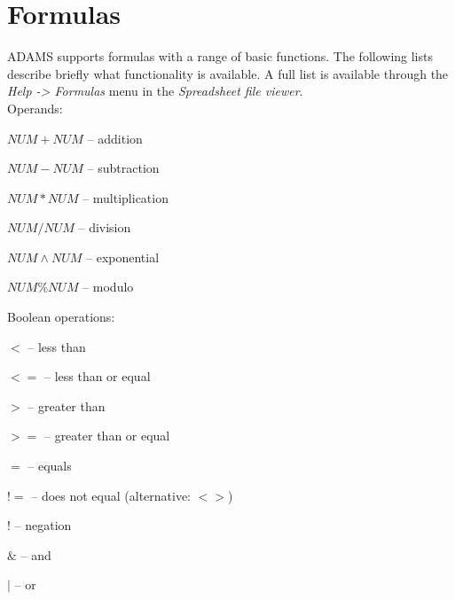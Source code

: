 \documentclass[a4paper]{book}
\begin{document}
\clearpage
\chapter{Formulas}
ADAMS supports formulas with a range of basic functions. The following lists
describe briefly what functionality is available. A full list is available 
through the \textit{Help -> Formulas} menu in the \textit{Spreadsheet file viewer}. \\

\noindent Operands:
\begin{tight_itemize}
	\item \textit{$NUM + NUM$} -- addition
	\item \textit{$NUM - NUM$} -- subtraction
	\item \textit{$NUM * NUM$} -- multiplication
	\item \textit{$NUM / NUM$} -- division
	\item \textit{$NUM \wedge NUM$} -- exponential
	\item \textit{$NUM \% NUM$} -- modulo
\end{tight_itemize}

\noindent Boolean operations:
\begin{tight_itemize}
	\item \textit{$<$} -- less than
	\item \textit{$<=$} -- less than or equal
	\item \textit{$>$} -- greater than
	\item \textit{$>=$} -- greater than or equal
	\item \textit{$=$} -- equals
	\item \textit{$!=$} -- does not equal (alternative: \textit{$<>$})
	\item \textit{$!$} -- negation
	\item \textit{$\&$} -- and
	\item \textit{$|$} -- or
\end{tight_itemize}
\end{document}
